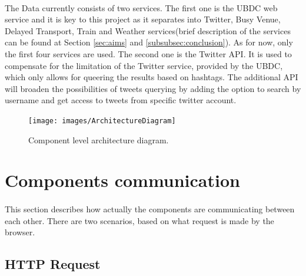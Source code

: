 \documentclass{l4proj}
\begin{document}
\paragraph{}
The Data currently consists of two services. The first one is the UBDC web service and it is key to this project as it separates into Twitter, Busy Venue, Delayed Transport, Train and Weather services(brief description of the services can be found at Section \ref{sec:aims} and \ref{subsubsec:conclusion}). As for now, only the first four services are used. The second one is the Twitter API. It is used to compensate for the limitation of the Twitter service, provided by the UBDC, which only allows for queering the results based on hashtags. The additional API will broaden the possibilities of tweets querying by adding the option to search by username and get access to tweets from specific twitter account.        
  

\begin{figure}[H]
	\centering
	\texttt{[image: images/ArchitectureDiagram]}
	\caption{Component level architecture diagram.}
	\label{componentDiagram}
\end{figure}

\section{Components communication}
\paragraph{}
This section describes how actually the components are communicating between each other. There are two scenarios, based on what request is made by the browser. 

\subsection{HTTP Request}
\end{document}
